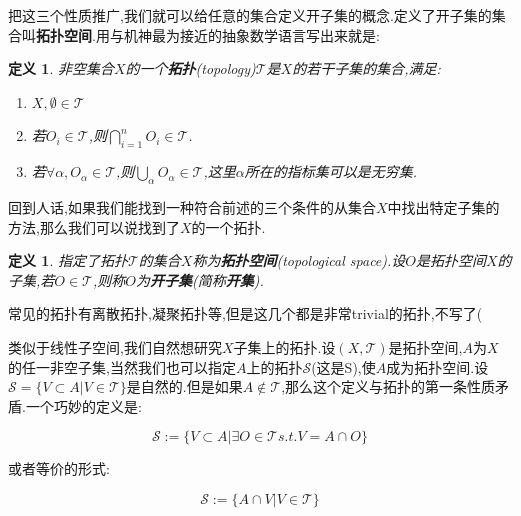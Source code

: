 \documentclass[UTF8]{article}
\begin{document}
	把这三个性质推广,我们就可以给任意的集合定义开子集的概念.定义了开子集的集合叫\textbf{拓扑空间}.用与机神最为接近的抽象数学语言写出来就是:
	
	\newtheorem*{topology}{定义}
	
	\begin{topology}
		
		非空集合$X$的一个\textbf{拓扑}(topology)$\mathscr{T}$是$X$的若干子集的集合,满足:
		
		\begin{enumerate}
			
			\item $X, \emptyset \in \mathscr{T}$
			
			\item 若$O_i \in \mathscr{T}$,则$\bigcap_{i=1}^n O_{i} \in \mathscr{T}$.
			
			\item 若$\forall \alpha, O_{\alpha} \in \mathscr{T}$,则$\bigcup_{\alpha} O_{\alpha} \in \mathscr{T}$,这里$\alpha$所在的指标集可以是无穷集.
		\end{enumerate}
		
	\end{topology}
	
	回到人话,如果我们能找到一种符合前述的三个条件的从集合$X$中找出特定子集的方法,那么我们可以说找到了$X$的一个拓扑.
	
	\newtheorem*{topologicalSpace}{定义}
	
	\begin{topologicalSpace}
		
		指定了拓扑$\mathscr{T}$的集合$X$称为\textbf{拓扑空间}(topological space).设$O$是拓扑空间$X$的子集,若$O \in \mathscr{T}$,则称$O$为\textbf{开子集}(简称\textbf{开集}).
		
	\end{topologicalSpace}
	
	常见的拓扑有离散拓扑,凝聚拓扑等,但是这几个都是非常trivial的拓扑,不写了(
	
	类似于线性子空间,我们自然想研究$X$子集上的拓扑.设$(X,\mathscr{T})$是拓扑空间,$A$为$X$的任一非空子集,当然我们也可以指定$A$上的拓扑$\mathscr{S}$(这是S),使$A$成为拓扑空间.设$\mathscr{S} = \{V \subset A | V \in \mathscr{T}\}$是自然的.但是如果$A \notin \mathscr{T}$,那么这个定义与拓扑的第一条性质矛盾.一个巧妙的定义是:
	
	\[\mathscr{S} := \{V \subset A | \exists O \in \mathscr{T} s.t. V = A \cap O\}\]
	
	或者等价的形式:
	
	\[\mathscr{S} := \{A \cap V | V \in \mathscr{T}\}\]
	
\end{document}
